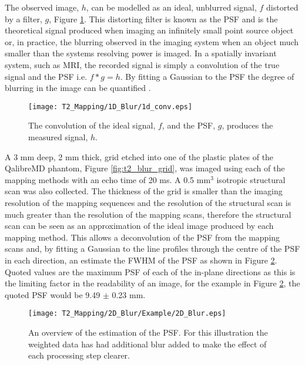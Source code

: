 The observed image, $h$, can be modelled as an ideal, unblurred signal, $f$ distorted by a filter, $g$, Figure \ref{fig:t2_1d_blur}. This distorting filter is known as the \ac{PSF} and is the theoretical signal produced when imaging an infinitely small point source object or, in practice, the blurring observed in the imaging system when an object much smaller than the systems resolving power is imaged. In a spatially invariant system, such as \ac{MRI}, the recorded signal is simply a convolution of the true signal and the \ac{PSF} i.e. $f \ast g = h$. By fitting a Gaussian to the \ac{PSF} the degree of blurring in the image can be quantified \cite{chaimow_more_2017, chaimow_more_2017-1}. 
\begin{figure}[H]
	\centering
	\texttt{[image: T2\_Mapping/1D\_Blur/1d\_conv.eps]}
	\caption{The convolution of the ideal signal, $f$, and the \ac{PSF}, $g$, produces the measured signal, $h$.}
	\label{fig:t2_1d_blur}	
\end{figure}

A 3 mm deep, 2 mm thick, grid etched into one of the plastic plates of the QalibreMD phantom, Figure \ref{fig:t2_blur_grid}, was imaged using each of the \ttwo mapping methods with an echo time of 20 ms. A 0.5 mm$^3$ isotropic structural scan was also collected. The thickness of the grid is smaller than the imaging resolution of the \ttwo mapping sequences and the resolution of the structural scan is much greater than the resolution of the \ttwo mapping scans, therefore the structural scan can be seen as an approximation of the ideal image produced by each \ttwo mapping method. This allows a deconvolution of the \ac{PSF} from the \ttwo mapping scans and, by fitting a Gaussian to the line profiles through the centre of the \ac{PSF} in each direction, an estimate the \ac{FWHM} of the \ac{PSF} as shown in Figure \ref{fig:t2_2d_blur}. Quoted values are the maximum \ac{PSF} of each of the in-plane directions as this is the limiting factor in the readability of an image, for the example in Figure \ref{fig:t2_2d_blur}, the quoted \ac{PSF} would be 9.49 $\pm$ 0.23 mm.

\begin{figure}[H]
	\centering
	\texttt{[image: T2\_Mapping/2D\_Blur/Example/2D\_Blur.eps]}
	\caption{An overview of the estimation of the \ac{PSF}. For this illustration the \ttwo weighted data has had additional blur added to make the effect of each processing step clearer.}
	\label{fig:t2_2d_blur}	
\end{figure}

